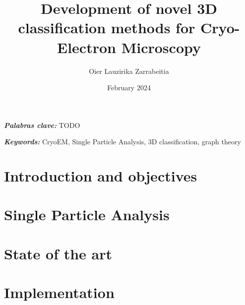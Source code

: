 \documentclass{etsit-report}
\title{Development of novel 3D classification methods for Cryo-Electron Microscopy}
\author{Oier Lauzirika Zarrabeitia}
\date{February 2024}
\begin{document}
\frontmatter

\cleardoublepage
\makefrontpage

\cleardoublepage
\makeinfopage

\cleardoublepage
\maketitle

\newpage\thispagestyle{empty}
\begin{otherlanguage}{spanish}
\begin{abstract}
    
\end{abstract}
\textit{\textbf{Palabras clave:}}
TODO

\newpage\thispagestyle{empty}
\end{otherlanguage}
\begin{abstract}
    
\end{abstract}
\textit{\textbf{Keywords: }}
CryoEM, Single Particle Analysis, 3D classification, graph theory

\cleardoublepage
\tableofcontents
\listoffigures
\listoftables

\printglossary[type=\acronymtype]

\mainmatter

\chapter{Introduction and objectives}
\label{chap:introduction}


\chapter{Single Particle Analysis}
\label{chap:spa}


\chapter{State of the art}
\label{chap:state_of_the_art}


\chapter{Implementation}
\label{chap:implementation}

\end{document}
